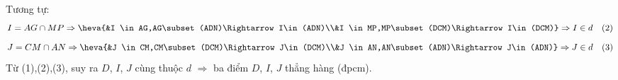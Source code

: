 \begin{bt}
{\begin{enumerate}
			Tương tự:\\
			$$I=AG\cap MP \Rightarrow \heva{&I \in AG,AG\subset (ADN)\Rightarrow I\in(ADN)\\&I \in MP,MP\subset (DCM)\Rightarrow I\in(DCM)}\Rightarrow I\in d\quad (2)$$
			$$J=CM\cap AN \Rightarrow \heva{&J \in CM,CM\subset (DCM)\Rightarrow J\in(DCM)\\&J \in AN,AN\subset (ADN)\Rightarrow J\in(ADN)}\Rightarrow J\in d\quad (3)$$
			Từ (1),(2),(3), suy ra $D$, $I$, $J$ cùng thuộc $d$ $\Rightarrow$ ba điểm $D$, $I$, $J$ thẳng hàng (đpcm).
		\end{enumerate}	
	}
\end{bt}

\begin{bt}%


\end{bt}
